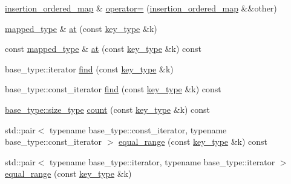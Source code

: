\begin{DoxyCompactItemize}
\hyperlink{classIceBRG_1_1insertion__ordered__map}{insertion\+\_\+ordered\+\_\+map} \& \hyperlink{classIceBRG_1_1insertion__ordered__map_a178ee1f5b892403fe3fe1084c65f2d0c}{operator=} (\hyperlink{classIceBRG_1_1insertion__ordered__map}{insertion\+\_\+ordered\+\_\+map} \&\&other)
\item 
\hyperlink{classIceBRG_1_1insertion__ordered__map_a4ab99f9f37138d3239735b5ff4aac2e5}{mapped\+\_\+type} \& \hyperlink{classIceBRG_1_1insertion__ordered__map_aef97a47f0b2bdcdaa37bcb3dee9fd8b6}{at} (const \hyperlink{classIceBRG_1_1insertion__ordered__map_a89f1c1aa5a0c6d1a681a0957092bb738}{key\+\_\+type} \&k)
\item 
const \hyperlink{classIceBRG_1_1insertion__ordered__map_a4ab99f9f37138d3239735b5ff4aac2e5}{mapped\+\_\+type} \& \hyperlink{classIceBRG_1_1insertion__ordered__map_af812acebdf449029907f7dacce4b5da0}{at} (const \hyperlink{classIceBRG_1_1insertion__ordered__map_a89f1c1aa5a0c6d1a681a0957092bb738}{key\+\_\+type} \&k) const 
\item 
base\+\_\+type\+::iterator \hyperlink{classIceBRG_1_1insertion__ordered__map_a78dfab2ce10559843aeb83d817dd9171}{find} (const \hyperlink{classIceBRG_1_1insertion__ordered__map_a89f1c1aa5a0c6d1a681a0957092bb738}{key\+\_\+type} \&k)
\item 
base\+\_\+type\+::const\+\_\+iterator \hyperlink{classIceBRG_1_1insertion__ordered__map_a4453d88b81a7ec0c786542b9eee19f46}{find} (const \hyperlink{classIceBRG_1_1insertion__ordered__map_a89f1c1aa5a0c6d1a681a0957092bb738}{key\+\_\+type} \&k) const 
\item 
\hyperlink{lib_2IceBRG__main_2common_8h_a566c61f2ca17211f4ba8557f3f65e8d3}{base\+\_\+type\+::size\+\_\+type} \hyperlink{classIceBRG_1_1insertion__ordered__map_a3c728c0dee432431a5354a5a4f90e46b}{count} (const \hyperlink{classIceBRG_1_1insertion__ordered__map_a89f1c1aa5a0c6d1a681a0957092bb738}{key\+\_\+type} \&k) const 
\item 
std\+::pair$<$ typename base\+\_\+type\+::const\+\_\+iterator, typename base\+\_\+type\+::const\+\_\+iterator $>$ \hyperlink{classIceBRG_1_1insertion__ordered__map_a862013899251bdcfe2a0d577206a9937}{equal\+\_\+range} (const \hyperlink{classIceBRG_1_1insertion__ordered__map_a89f1c1aa5a0c6d1a681a0957092bb738}{key\+\_\+type} \&k) const 
\item 
std\+::pair$<$ typename base\+\_\+type\+::iterator, typename base\+\_\+type\+::iterator $>$ \hyperlink{classIceBRG_1_1insertion__ordered__map_a0cd1e5de494b9499089ab3b2ccecd0cd}{equal\+\_\+range} (const \hyperlink{classIceBRG_1_1insertion__ordered__map_a89f1c1aa5a0c6d1a681a0957092bb738}{key\+\_\+type} \&k)

\end{DoxyCompactItemize}
